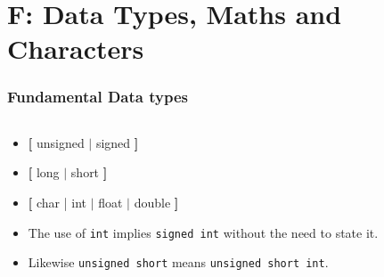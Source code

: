 \section{F: Data Types, Maths and Characters}


\begin{frame}[fragile]
\frametitle{Fundamental Data types}

\begin{columns}

\begin{column}[c]{0.35\textwidth}
{\small
\begin{itemize}[<+->]
\item {\bf [} unsigned $|$ signed {\bf ]}
\item {\bf [} long $|$ short {\bf ]}
\item {\bf [} char | int $|$ float $|$ double {\bf ]}
\item The use of {\tt int} implies {\tt signed int} without the need to state it.
\item Likewise {\tt unsigned short} means {\tt unsigned short int}.
\end{itemize}
}
\end{column}


\end{columns}
\end{frame}
